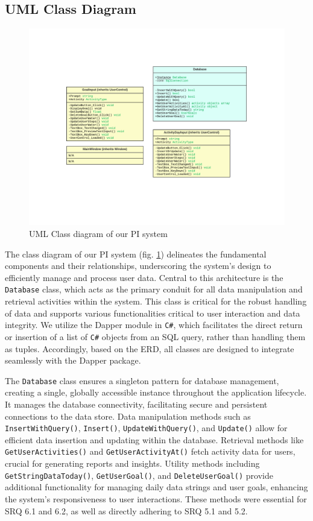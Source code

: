 \documentclass[12pt]{article}
\begin{document}
\subsection{UML Class Diagram}

\begin{figure}[!ht]
  \centering
  \includegraphics[width = 0.7\linewidth]{UML Class diagram}
  \caption{UML Class diagram of our PI system}
  \label{fig:Class}
\end{figure}

The class diagram of our PI system (fig. \ref{fig:Class}) delineates the
fundamental components and their relationships, underscoring the system's
design to efficiently manage and process user data. Central to this
architecture is the \texttt{Database} class, which acts as the primary conduit for all
data manipulation and retrieval activities within the system. This class is
critical for the robust handling of data and supports various functionalities
critical to user interaction and data integrity. We utilize the Dapper module 
in \texttt{C#}, which facilitates the direct return or insertion of a list of 
\texttt{C#} objects from an SQL query, rather than handling them as tuples. 
Accordingly, based on the ERD, all classes are designed to integrate seamlessly
with the Dapper package.\par

The \texttt{Database} class ensures a singleton pattern for database management,
creating a single, globally accessible instance throughout the application
lifecycle. It manages the database connectivity, facilitating secure and
persistent connections to the data store. Data manipulation methods such as
\texttt{InsertWithQuery()}, \texttt{Insert()}, \texttt{UpdateWithQuery()}, and \texttt{Update()} allow for
efficient data insertion and updating within the database. Retrieval methods
like \texttt{GetUserActivities()} and \texttt{GetUserActivityAt()} fetch activity data for users,
crucial for generating reports and insights. Utility methods including
\texttt{GetStringDataToday()}, \texttt{GetUserGoal()}, and \texttt{DeleteUserGoal()} provide additional
functionality for managing daily data strings and user goals, enhancing the
system’s responsiveness to user interactions. These methods were essential for
SRQ 6.1 and 6.2, as well as directly adhering to SRQ 5.1 and 5.2. \par
\end{document}
